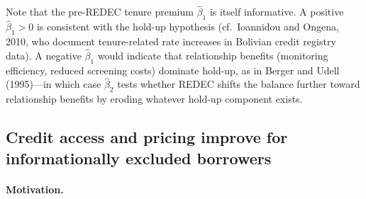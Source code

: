 \documentclass[12pt]{article}
\theoremstyle{plain}
\theoremstyle{plain}
\begin{document}
Note that the pre-REDEC tenure premium $\hat{\beta}_1$ is itself informative. A positive $\hat{\beta}_1 > 0$ is consistent with the hold-up hypothesis (cf.\ Ioannidou and Ongena, 2010, who document tenure-related rate increases in Bolivian credit registry data). A negative $\hat{\beta}_1$ would indicate that relationship benefits (monitoring efficiency, reduced screening costs) dominate hold-up, as in Berger and Udell (1995)---in which case $\hat{\beta}_2$ tests whether REDEC shifts the balance further toward relationship benefits by eroding whatever hold-up component exists.


\subsection{Credit access and pricing improve for informationally excluded borrowers}

\paragraph{Motivation.} 
\end{document}
